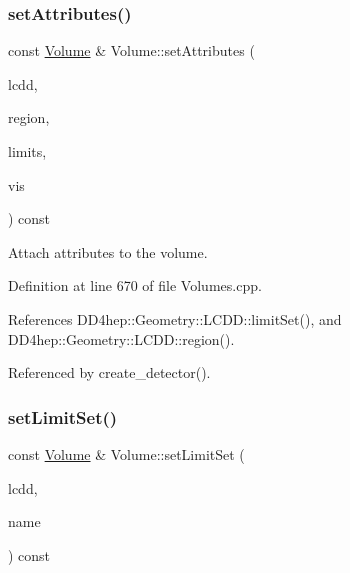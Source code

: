 \subsubsection{\texorpdfstring{set\+Attributes()}{setAttributes()}}
{\footnotesize\ttfamily const \hyperlink{class_d_d4hep_1_1_geometry_1_1_volume}{Volume} \& Volume\+::set\+Attributes (\begin{DoxyParamCaption}\item[{const \hyperlink{class_d_d4hep_1_1_geometry_1_1_l_c_d_d}{L\+C\+DD} \&}]{lcdd,  }\item[{const std\+::string \&}]{region,  }\item[{const std\+::string \&}]{limits,  }\item[{const std\+::string \&}]{vis }\end{DoxyParamCaption}) const}



Attach attributes to the volume. 



Definition at line 670 of file Volumes.\+cpp.



References D\+D4hep\+::\+Geometry\+::\+L\+C\+D\+D\+::limit\+Set(), and D\+D4hep\+::\+Geometry\+::\+L\+C\+D\+D\+::region().



Referenced by create\+\_\+detector().

\hypertarget{class_d_d4hep_1_1_geometry_1_1_volume_ace16eeb3999b91c056b5fd809054b4bd}{}\label{class_d_d4hep_1_1_geometry_1_1_volume_ace16eeb3999b91c056b5fd809054b4bd} 
\subsubsection{\texorpdfstring{set\+Limit\+Set()}{setLimitSet()}\hspace{0.1cm}{\footnotesize\ttfamily [1/2]}}
{\footnotesize\ttfamily const \hyperlink{class_d_d4hep_1_1_geometry_1_1_volume}{Volume} \& Volume\+::set\+Limit\+Set (\begin{DoxyParamCaption}\item[{const \hyperlink{class_d_d4hep_1_1_geometry_1_1_l_c_d_d}{L\+C\+DD} \&}]{lcdd,  }\item[{const std\+::string \&}]{name }\end{DoxyParamCaption}) const}




